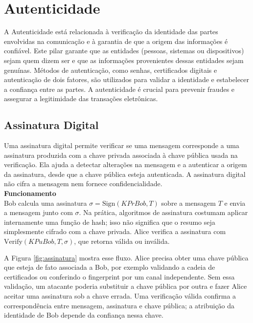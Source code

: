 \section{Autenticidade}

A Autenticidade está relacionada à verificação da identidade das partes envolvidas na comunicação e à garantia de que a origem das informações é confiável. Este pilar garante que as entidades (pessoas, sistemas ou dispositivos) sejam quem dizem ser e que as informações provenientes dessas entidades sejam genuínas. Métodos de autenticação, como senhas, certificados digitais e autenticação de dois fatores, são utilizados para validar a identidade e estabelecer a confiança entre as partes. A autenticidade é crucial para prevenir fraudes e assegurar a legitimidade das transações eletrônicas.

\subsection{Assinatura Digital}

Uma assinatura digital permite verificar se uma mensagem corresponde a uma assinatura produzida com a chave privada associada à chave pública usada na verificação. Ela ajuda a detectar alterações na mensagem e a autenticar a origem da assinatura, desde que a chave pública esteja autenticada. A assinatura digital não cifra a mensagem nem fornece confidencialidade.\\

\textbf{Funcionamento}\\

Bob calcula uma assinatura \(\sigma=\mathrm{Sign}(KPrBob,T)\) sobre a mensagem \(T\) e envia a mensagem junto com \(\sigma\). Na prática, algoritmos de assinatura costumam aplicar internamente uma função de hash; isso não significa que o resumo seja simplesmente cifrado com a chave privada. Alice verifica a assinatura com \(\mathrm{Verify}(KPuBob,T,\sigma)\), que retorna válida ou inválida.

A Figura \ref{fig:assinatura} mostra esse fluxo. Alice precisa obter uma chave pública que esteja de fato associada a Bob, por exemplo validando a cadeia de certificados ou conferindo o fingerprint por um canal independente. Sem essa validação, um atacante poderia substituir a chave pública por outra e fazer Alice aceitar uma assinatura sob a chave errada. Uma verificação válida confirma a correspondência entre mensagem, assinatura e chave pública; a atribuição da identidade de Bob depende da confiança nessa chave.


